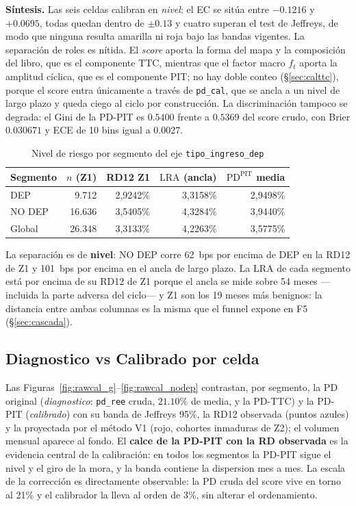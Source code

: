 \documentclass[12pt, a4paper]{article}
\newcommand{\PDPIT}{\ensuremath{\mathrm{PD}^{\mathrm{PIT}}}}
\newcommand{\LRA}{\ensuremath{\mathrm{LRA}}}
\newcommand{\ft}{\ensuremath{f_t}}
\begin{document}
\noindent\textbf{Síntesis.} Las seis celdas calibran en \emph{nivel}: el EC se sitúa entre
$-0.1216$ y $+0.0695$, todas quedan dentro de $\pm0.13$ y cuatro superan el test de Jeffreys, de
modo que ninguna resulta amarilla ni roja bajo las bandas vigentes. La separación de roles es
nítida. El \emph{score} aporta la forma del mapa y la composición del libro, que es el componente
TTC, mientras que el factor macro $\ft$ aporta la amplitud cíclica, que es el componente PIT; no
hay doble conteo (\S\ref{sec:calttc}), porque el score entra únicamente a través de
\texttt{pd\_cal}, que se ancla a un nivel de largo plazo y queda ciego al ciclo por construcción.
La discriminación tampoco se degrada: el Gini de la PD-PIT es $0.5400$ frente a $0.5369$ del score
crudo, con Brier $0.030671$ y ECE de 10 bins igual a $0.0027$.

\begin{table}[H]
\centering
\caption{Nivel de riesgo por segmento del eje \texttt{tipo\_ingreso\_dep}}
\label{tab:rdseg}
\small
\begin{tabular}{lrrrr}
\toprule
\textbf{Segmento} & \textbf{$n$ (Z1)} & \textbf{RD12 Z1} & \textbf{\LRA{} (ancla)} & \textbf{$\PDPIT$ media} \\
\midrule
DEP     &  9.712 & 2,9242\% & 3,3158\% & 2,9498\% \\
NO DEP  & 16.636 & 3,5405\% & 4,3284\% & 3,9440\% \\
\midrule
Global  & 26.348 & 3,3133\% & 4,2263\% & 3,5775\% \\
\bottomrule
\end{tabular}
\end{table}

\noindent La separación es de \textbf{nivel}: NO DEP corre 62~bps por encima de DEP en la RD12 de Z1
y 101~bps por encima en el ancla de largo plazo. La \LRA{} de cada segmento está por encima de su
RD12 de Z1 porque el ancla se mide sobre 54 meses ---incluida la parte adversa del ciclo--- y Z1
son los 19 meses más benignos: la distancia entre ambas columnas es la misma que el funnel expone
en F5 (\S\ref{sec:cascada}).

\subsection{Diagnostico vs Calibrado por celda}
\label{sec:figdiag}
Las Figuras~\ref{fig:rawcal_g}--\ref{fig:rawcal_nodep} contrastan, por segmento, la PD original
(\emph{diagnostico}: \texttt{pd\_ree} cruda, $21.10\%$ de media, y la PD-TTC) y la PD-PIT
(\emph{calibrado}) con su banda de Jeffreys 95\%, la RD12 observada (puntos azules) y la proyectada
por el método V1 (rojo, cohortes inmaduras de Z2); el volumen mensual aparece al fondo. El
\textbf{calce de la PD-PIT con la RD observada} es la evidencia central de la calibración: en todos
los segmentos la PD-PIT sigue el nivel y el giro de la mora, y la banda contiene la dispersion mes a
mes. La escala de la corrección es directamente observable: la PD cruda del score vive en torno al 21\% y
el calibrador la lleva al orden de 3\%, sin alterar el ordenamiento.
\end{document}
